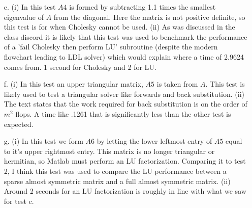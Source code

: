 \documentclass[12pt]{article}
\makeatletter
\theoremstyle{homework}
\newenvironment{exercise}[1]
{\def\@currentlabel{#1}\exercisecore}
{\endexercisecore}
\makeatother
\begin{document}
\begin{exercise}{23.3}
\begin{enumerate}
    \item[e.] (i) In this test $A4$ is formed by subtracting 1.1 times the smallest eigenvalue of $A$ from the diagonal. Here the matrix is not positive definite, so this test is for when Cholesky cannot be used. (ii) As was discussed in the class discord
    it is likely that this test was used to benchmark the performance of a 'fail Cholesky then perform LU' subroutine (despite the modern flowchart leading to LDL solver) which would explain where a time of 2.9624 comes from. 1 second for Cholesky and 2 for LU. 
    \vspace{.15in}

    \item[f.] (i) In this test an upper triangular matrix, $A5$ is taken from $A$. This test is likely used to test a triangular solver like forwards and back substitution. (ii) The text states that the work required for back substitution is on the order of 
    $m^2$ flops. A time like .1261 that is significantly less than the other test is expected. 
    \vspace{.15in}

    \item[g.] (i) In this test we form $A6$ by letting the lower leftmost entry of $A5$ equal to it's upper rightmost entry. This matrix is no longer triangular or hermitian, so Matlab must perform an LU factorization. Comparing it to test 2, I think this 
    test was used to compare the LU performance between a sparse almost symmetric matrix and a full almost symmetric matrix.  (ii) Around 2 seconds for 
    an LU factorization is roughly in line with what we saw for test c.  
  \end{enumerate}

\end{exercise}
\vspace{1in}
\end{document}
